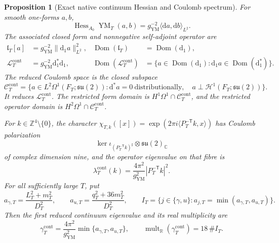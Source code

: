 \documentclass[11pt]{article}
\newtheorem{proposition}[theorem]{Proposition}
\theoremstyle{definition}
\numberwithin{equation}{section}
\begin{document}
\begin{proposition}[Exact native continuum Hessian and Coulomb spectrum]
\label{cusp-link-native-continuum-hessian}
For smooth one-forms \(a,b\),
\begin{equation}
 \operatorname{Hess}_{A_0}\operatorname{YM}_T(a,b)
 =g_{\mathrm{YM}}^{-2}\langle\mathrm da,\mathrm db\rangle_{L^2}.
 \label{cusp-link-native-hessian-formula}
\end{equation}
The associated closed form and nonnegative self-adjoint operator are
\begin{align}
 \mathfrak l_T[a]&=g_{\mathrm{YM}}^{-2}\|\mathrm d_1a\|_{L^2}^2,
 &\operatorname{Dom}(\mathfrak l_T)&=\operatorname{Dom}(\mathrm d_1),
 \label{cusp-link-native-closed-form}\\
 \mathcal L_T^{\mathrm{cont}}
 &=g_{\mathrm{YM}}^{-2}\mathrm d_1^*\mathrm d_1,
 &\operatorname{Dom}(\mathcal L_T^{\mathrm{cont}})
 &=\{a\in\operatorname{Dom}(\mathrm d_1):
      \mathrm d_1a\in\operatorname{Dom}(\mathrm d_1^*)\}.
 \label{cusp-link-native-continuum-operator}
\end{align}
The reduced Coulomb space is the closed subspace
\begin{equation}
 \mathscr C_T^{\mathrm{cont}}
 =\{a\in L^2\Omega^1(F_T;\mathfrak{su}(2)):
      \mathrm d^*a=0\ \text{distributionally},\quad
      a\perp\mathcal H^1(F_T;\mathfrak{su}(2))\}.
 \label{cusp-link-native-continuum-coulomb}
\end{equation}
It reduces \(\mathcal L_T^{\mathrm{cont}}\).  The restricted form domain is
\(H^1\Omega^1\cap\mathscr C_T^{\mathrm{cont}}\), and the restricted operator
domain is \(H^2\Omega^1\cap\mathscr C_T^{\mathrm{cont}}\).

For \(k\in\mathbb Z^4\setminus\{0\}\), the character
\(\chi_{T,k}([x])=\exp(2\pi i\langle P_T^{-\mathsf T}k,x\rangle)\)
has Coulomb polarization
\begin{equation}
 \ker\iota_{(P_T^{-\mathsf T}k)^\sharp}
 \otimes\mathfrak{su}(2)_{\mathbb C}
 \label{cusp-link-native-continuum-polarization}
\end{equation}
of complex dimension nine, and the operator eigenvalue on that fibre is
\begin{equation}
 \lambda_T^{\mathrm{cont}}(k)
 =\frac{4\pi^2}{g_{\mathrm{YM}}^2}|P_T^{-\mathsf T}k|^2.
 \label{cusp-link-native-continuum-eigenvalue}
\end{equation}
For all sufficiently large \(T\), put
\begin{equation}
 a_{\gamma,T}=\frac{L_T^2+m_T^2}{D_T^2},
 \qquad
 a_{u,T}=\frac{q_T^2+36m_T^2}{D_T^2},
 \qquad
 I_T=\{j\in\{\gamma,u\}:a_{j,T}=\min(a_{\gamma,T},a_{u,T})\}.
 \label{cusp-link-native-short-data}
\end{equation}
Then the first reduced continuum eigenvalue and its real multiplicity are
\begin{equation}
 \gamma_T^{\mathrm{cont}}
 =\frac{4\pi^2}{g_{\mathrm{YM}}^2}
   \min\{a_{\gamma,T},a_{u,T}\},
 \qquad
 \operatorname{mult}_{\mathbb R}(\gamma_T^{\mathrm{cont}})=18\,\#I_T.
 \label{cusp-link-native-continuum-gap}
\end{equation}
\end{proposition}
\end{document}
